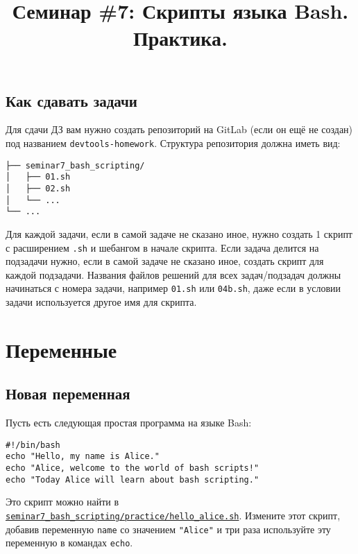 \documentclass{article}
\begin{document}
\title{Семинар \#7: Скрипты языка Bash. Практика. \vspace{-5ex}}\date{}\maketitle
\subsection*{Как сдавать задачи}
Для сдачи ДЗ вам нужно создать репозиторий на GitLab (если он ещё не создан) под названием \texttt{devtools-homework}. Структура репозитория должна иметь вид:
\begin{center}
\begin{BVerbatim}
├── seminar7_bash_scripting/
│   ├── 01.sh
│   ├── 02.sh
│   └── ...
└── ...
\end{BVerbatim}
\end{center}
Для каждой задачи, если в самой задаче не сказано иное, нужно создать 1 скрипт с расширением \texttt{.sh} и шебангом в начале скрипта. Если задача делится на подзадачи нужно, если в самой задаче не сказано иное, создать скрипт для каждой подзадачи. Названия файлов решений для всех задач/подзадач должны начинаться с номера задачи, например \texttt{01.sh} или \texttt{04b.sh}, даже если в условии задачи используется другое имя для скрипта.  \\



\section{Переменные}

\subsection{Новая переменная}
Пусть есть следующая простая программа на языке Bash:
\begin{lstlisting}
#!/bin/bash
echo "Hello, my name is Alice."
echo "Alice, welcome to the world of bash scripts!"
echo "Today Alice will learn about bash scripting."
\end{lstlisting}
Это скрипт можно найти в \href{https://mipt-hsse.gitlab.yandexcloud.net/v.biryukov/devtools_course/seminar7_bash_scripting/practice/hello_alice.sh}{\texttt{seminar7\_bash\_scripting/practice/hello\_alice.sh}}. Измените этот скрипт, добавив переменную \texttt{name} со значением \texttt{"Alice"} и три раза используйте эту переменную в командах \texttt{echo}.
\end{document}
